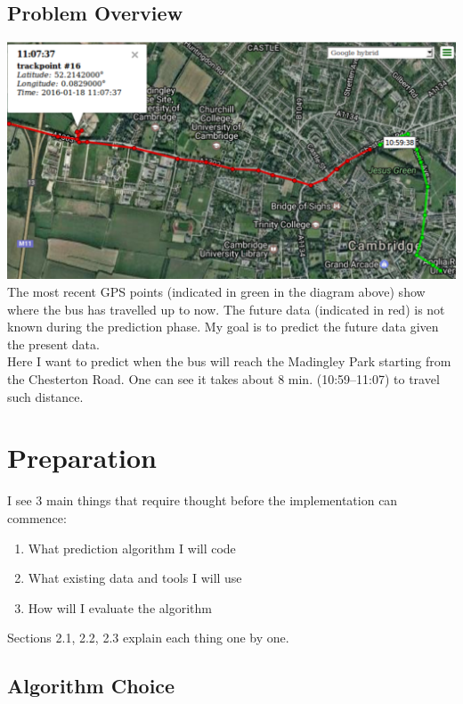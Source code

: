 \documentclass[12pt,a4paper,oneside,openright]{report}
\begin{document}
\section{Problem Overview}

\includegraphics[width=\textwidth]{figs/problem_overview.png} \\

The most recent GPS points (indicated in green in the diagram above) show
where the bus has travelled up to now. The future data (indicated in red)
is not known during the prediction phase. My goal is to predict the future
data given the present data. \\

Here I want to predict when the bus will reach the Madingley Park starting from the
Chesterton Road. One can see it takes about 8 min. (10:59--11:07) to travel such distance.

\chapter{Preparation}

I see 3 main things that require thought before the implementation can commence:

\begin{enumerate}
\item What prediction algorithm I will code
\item What existing data and tools I will use
\item How will I evaluate the algorithm
\end{enumerate}

Sections 2.1, 2.2, 2.3 explain each thing one by one.

\section{Algorithm Choice}
\end{document}
